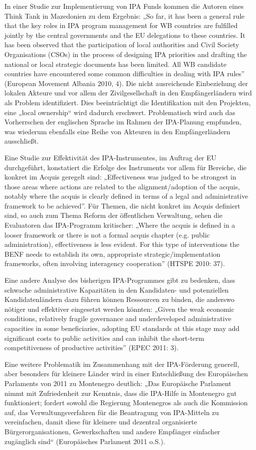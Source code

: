 In einer Studie zur Implementierung von IPA Funds kommen die Autoren eines Think Tank in Mazedonien zu dem Ergebnis: „So far, it has been a general rule that the key roles in IPA program management for WB countries are fulfilled jointly by the central governments and the EU delegations to these countries. It has been observed that the participation of local authorities and Civil Society Organisations (CSOs) in the process of designing IPA priorities and drafting the national or local strategic documents has been limited. All WB candidate countries have encountered some common difficulties in dealing with IPA rules” (European Movement Albania 2010, 4). Die nicht ausreichende Einbeziehung der lokalen Akteure und vor allem der Zivilgesellschaft in den Empfängerländern wird als Problem identifiziert. Dies beeinträchtigt die Identifikation mit den Projekten, eine „local ownership“ wird dadurch erschwert. Problematisch wird auch das Vorherrschen der englischen Sprache im Rahmen der IPA-Planung empfunden, was wiederum ebenfalls eine Reihe von Akteuren in den Empfängerländern ausschließt.\par
Eine Studie zur Effektivität des IPA-Instrumentes, im Auftrag der EU durchgeführt, konstatiert die Erfolge des Instruments vor allem für Bereiche, die konkret im Acquis geregelt sind: „Effectiveness was judged to be strongest in those areas where actions are related to the alignment/adoption of the acquis, notably where the acquis is clearly defined in terms of a legal and administrative framework to be achieved”. Für Themen, die nicht konkret im Acquis definiert sind, so auch zum Thema Reform der öffentlichen Verwaltung, sehen die Evaluatoren das IPA-Programm kritischer: „Where the acquis is defined in a looser framework or there is not a formal acquis chapter (e.g. public administration), effectiveness is less evident. For this type of interventions the BENF needs to establish its own, appropriate strategic/implementation frameworks, often involving interagency cooperation” (HTSPE 2010: 37).\par
Eine andere Analyse des bisherigen IPA-Programmes gibt zu bedenken, dass schwache administrative Kapazitäten in den Kandidaten- und potenziellen Kandidatenländern dazu führen können Ressourcen zu binden, die anderswo nötiger und effektiver eingesetzt werden könnten: „Given the weak economic conditions, relatively fragile governance and underdeveloped administrative capacities in some beneficiaries, adopting EU standards at this stage may add significant costs to public activities and can inhibit the short-term competitiveness of productive activities” (EPEC 2011: 3).\par
Eine weitere Problematik im Zusammenhang mit der IPA-Förderung generell, aber besonders für kleinere Länder wird in einer Entschließung des Europäischen Parlaments von 2011 zu Montenegro deutlich: „Das Europäische Parlament nimmt mit Zufriedenheit zur Kenntnis, dass die IPA-Hilfe in Montenegro gut funktioniert; fordert sowohl die Regierung Montenegros als auch die Kommission auf, das Verwaltungsverfahren für die Beantragung von IPA-Mitteln zu vereinfachen, damit diese für kleinere und dezentral organisierte Bürgerorganisationen, Gewerkschaften und andere Empfänger einfacher zugänglich sind“ (Europäisches Parlament 2011 o.S.). 

